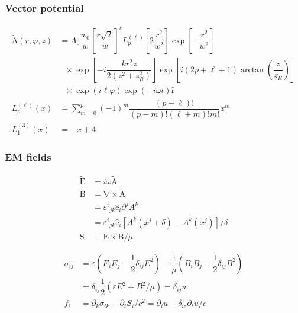 \documentclass[xcolor=dvipsnames]{beamer}
\newcommand{\f}[2]{\dfrac{#1}{#2}} %
\newcommand{\p}[1]{\left(#1\right)} %
\renewcommand{\sp}[1]{\left[#1\right]} %
\renewcommand{\epsilon}{\varepsilon} %
\renewcommand{\phi}{\varphi} %
\renewcommand{\v}[1]{\boldsymbol{\mathrm{#1}}} %
\newcommand{\uv}[1]{\hat{\boldsymbol{\mathrm{#1}}}} %
\newcommand{\del}{\v\nabla} %
\renewcommand{\d}{\partial} %
\newcommand{\cxv}[1]{\v{\widetilde{#1}}} %
\begin{document}
\begin{frame}
  \frametitle{Vector potential}
  \begin{align*}
    {\cxv A}\p{r,\phi,z}&=A_0\f{w_0}{w}\sp{\f{r\sqrt 2}{w}}^\ell
    L^{\p{\ell}}_p\sp{2\f{r^2}{w^2}}\exp\sp{-\f{r^2}{w^2}} \\
    &~~~\times\exp\sp{-i\f{kr^2z}{2\p{z^2+z_R^2}}}
    \exp\sp{i\p{2p+\ell+1}\arctan\p{\f z{z_R}}} \\
    &~~~\times\exp\p{i\ell\phi}\exp\p{-i\omega t} \uv r \\
    L^{\p{\ell}}_p\p{x}
    &=\sum_{m=0}^p\p{-1}^m\f{\p{p+\ell}!}{\p{p-m}!\p{\ell+m}!m!}x^m \\
    L^{\p{3}}_1\p{x}&=-x+4
  \end{align*}
\end{frame}

\begin{frame}
  \frametitle{EM fields}
  \begin{align*}
    \cxv E&=i\omega\cxv A \\
    \cxv B&=\del \times\cxv A \\
    &={\varepsilon^i}_{jk}\uv e_i\d^jA^k \\
    &={\varepsilon^i}_{jk}\uv
    e_i\sp{A^k\p{x^j+\delta}-A^k\p{x^j}}/\delta \\
    \v S&=\v E\times\v B/\mu
  \end{align*}
\end{frame}

\begin{frame}
  \begin{align*}
    \sigma_{ij}&=\epsilon\p{E_iE_j-\f12\delta_{ij}E^2}
    +\f1\mu\p{B_iB_j-\f12\delta_{ij}B^2} \\
    &=\delta_{ij}\f12\p{\epsilon
      E^2+B^2/\mu}=\delta_{ij}u \\
    f_i&=\d_k\sigma_{ik}-\d_tS_i/c^2=\d_iu-\delta_{iz}\d_tu/c
  \end{align*}
\end{frame}
\end{document}
